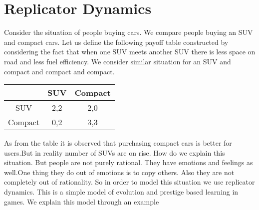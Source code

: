 \documentclass[letterpaper,english,12pt]{article}
\begin{document}
\section{Replicator Dynamics}
Consider the situation of people buying cars. We compare people buying an SUV and compact cars. Let us define the following payoff table constructed by considering the fact that when one SUV meets another SUV there is less space on road and less fuel efficiency. We consider  similar situation for an SUV and compact and compact and compact.

\begin{table}[ht]
\begin{center}
\begin{tabular}{|c|c|c|}
\hline
                   & SUV           & Compact        \\ \hline
SUV                 & 2,2       & 2,0      \\ \hline
Compact                  & 0,2         & 3,3      \\ \hline
\end{tabular}
\end{center}
\end{table}
As from the table it is observed that purchasing compact cars is better for users.But in reality number of SUVs are on rise. How do we explain this situation. But people are not purely rational. They have emotions and feelings as well.One thing they do out of emotions is to copy others. Also they are not completely out of rationality. So in  order to model this situation we use replicator dynamics.
This is a simple model of evolution and prestige based learning in games. We explain this model through an example\\ 
\end{document}
